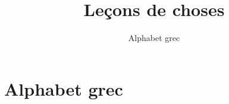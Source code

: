 


\usepackage{pifont}



\title{{\bf Leçons de choses}}
\subtitle{Alphabet grec}

\begin{frame}
  
  \debutmontitre

% 

\end{frame}

\setcounter{framenumber}{0}






\section{Alphabet grec}


